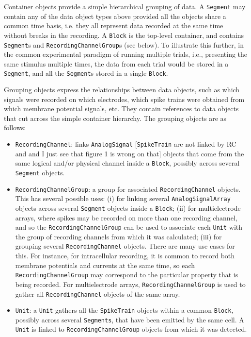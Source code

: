 \documentclass{frontiers}
\newcommand{\samuel}[1]{[\textcolor{RubineRed}{#1}]}
\begin{document}
Container objects provide a simple hierarchical grouping of data. 
A \lstinline`Segment` may contain any of the data object types above provided all the objects share a common time basis, i.e. they all represent data recorded at the same time without breaks in the recording. 
A \lstinline`Block` is the top-level container, and contains \lstinline`Segment`s and \lstinline`RecordingChannelGroup`s (see below).
To illustrate this further, in the common experimental paradigm of running multiple trials, i.e., presenting the same stimulus multiple times, the data from each trial would be stored in a \lstinline`Segment`, and all the \lstinline`Segment`s stored in a single \lstinline`Block`. 

Grouping objects express the relationships between data objects, such as which signals were recorded on which electrodes, which spike trains were obtained from which membrane potential signals, etc.
They contain references to data objects that cut across the simple container hierarchy.
The grouping objects are as follows:

\begin{itemize}
\item \lstinline`RecordingChannel`: links \lstinline`AnalogSignal` \samuel{\lstinline`SpikeTrain` are not linked by RC and and I just see that figure 1 is wrong on that} objects that come from the same logical and/or physical channel inside a \lstinline`Block`, possibly across several \lstinline`Segment` objects.
\item \lstinline`RecordingChannelGroup`: a group for associated \lstinline`RecordingChannel` objects. This has several possible uses: 
(i) for linking several \lstinline`AnalogSignalArray` objects across several \lstinline`Segment` objects inside a \lstinline`Block`;
(ii) for multielectrode arrays, where spikes may be recorded on more than one recording channel, and so the \lstinline`RecordingChannelGroup` can be used to associate each \lstinline`Unit` with the group of recording channels from which it was calculated;
(iii) for grouping several \lstinline`RecordingChannel` objects. There are many use cases for this. For instance, for intracellular recording, it is common to record both membrane potentials and currents at the same time, so each \lstinline`RecordingChannelGroup` may correspond to the particular property that is being recorded. For multielectrode arrays, \lstinline`RecordingChannelGroup` is used to gather all \lstinline`RecordingChannel` objects of the same array.
\item \lstinline`Unit`: a \lstinline`Unit` gathers all the \lstinline`SpikeTrain` objects within a common \lstinline`Block`, possibly across several \lstinline`Segments`, that have been emitted by the same cell. A \lstinline`Unit` is linked to \lstinline`RecordingChannelGroup` objects from which it was detected.
\end{itemize}
\end{document}
